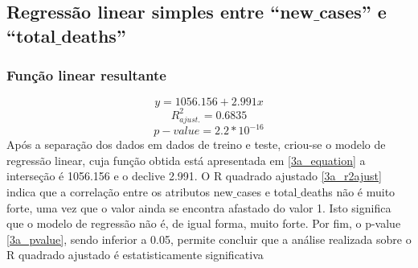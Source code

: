\documentclass[conference]{IEEEtran}
\begin{document}
\subsection{Regressão linear simples entre “new$\_$cases” e “total$\_$deaths”}

\subsubsection{Função linear resultante}
\begin{equation}
y = 1056.156 + 2.991x\label{3a_equation}
\end{equation}
\begin{equation}
R^{2}_{ajust.} = 0.6835\label{3a_r2ajust}
\end{equation}
\begin{equation}
p-value = 2.2*10^{-16}\label{3a_pvalue}
\end{equation}
Após a separação dos dados em dados de treino e teste, criou-se o modelo de regressão linear, cuja função obtida está apresentada em \eqref{3a_equation} a interseção é 1056.156 e o declive 2.991. 
O R quadrado ajustado \eqref{3a_r2ajust} indica que a correlação entre os atributos new$\_$cases e total$\_$deaths não é muito forte, uma vez que o valor ainda se encontra afastado do valor 1. Isto significa que o modelo de regressão não é, de igual forma, muito forte.
Por fim, o p-value \eqref{3a_pvalue}, sendo inferior a 0.05, permite concluir que a análise realizada sobre o R quadrado ajustado é estatisticamente significativa
\end{document}

